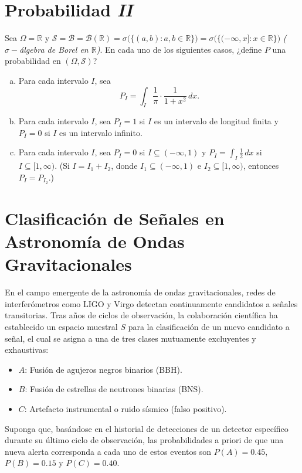 \documentclass[a4paper]{article}
\begin{document}
\section{Probabilidad \textit{II}}
\label{sec:problema-10}

Sea $\Omega = \mathbb{R}$ y $\mathcal{S} = \mathcal{B}=\mathcal{B}(\mathbb{R}) = \sigma\big(\{(a,b) : a,b \in \mathbb{R}\}\big) = \sigma\big(\{(-\infty, x] : x \in \mathbb{R}\}\big)$ \textit{($\sigma-$álgebra de Borel en $\mathbb{R}$)}. En cada uno de los siguientes casos, ¿define $P$ una probabilidad en $(\Omega, \mathcal{S})$?

\begin{enumerate}[a)]
    \item Para cada intervalo $I$, sea
    $$P_I = \int_I \frac{1}{\pi} \cdot \frac{1}{1+x^2} \, dx.$$
    \item Para cada intervalo $I$, sea $P_I = 1$ si $I$ es un intervalo de longitud finita y $P_I = 0$ si $I$ es un intervalo infinito.
    \item Para cada intervalo $I$, sea $P_I = 0$ si $I \subseteq (-\infty, 1)$ y $P_I = \int_I \frac{1}{2} \, dx$ si $I \subseteq [1, \infty)$. (Si $I = I_1 + I_2$, donde $I_1 \subseteq (-\infty, 1)$ e $I_2 \subseteq [1, \infty)$, entonces $P_I = P_{I_2}$.)
\end{enumerate}

\section{Clasificación de Señales en Astronomía de Ondas Gravitacionales}
\label{sec:problema-11}

En el campo emergente de la astronomía de ondas gravitacionales, redes de interferómetros como LIGO y Virgo detectan continuamente candidatos a señales transitorias. Tras años de ciclos de observación, la colaboración científica ha establecido un espacio muestral $S$ para la clasificación de un nuevo candidato a señal, el cual se asigna a una de tres clases mutuamente excluyentes y exhaustivas:

\begin{itemize}
\item $A$: Fusión de agujeros negros binarios (BBH).
\item $B$: Fusión de estrellas de neutrones binarias (BNS).
\item $C$: Artefacto instrumental o ruido sísmico (falso positivo).
\end{itemize}

Suponga que, basándose en el historial de detecciones de un detector específico durante su último ciclo de observación, las probabilidades a priori de que una nueva alerta corresponda a cada uno de estos eventos son $P(A) = 0.45$, $P(B) = 0.15$ y $P(C) = 0.40$.
\end{document}
